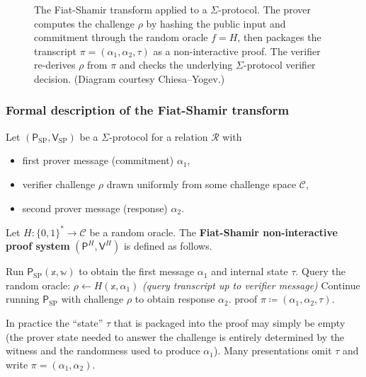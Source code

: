 \documentclass[11pt]{article}
\begin{document}
\begin{figure}[t]
\caption{The Fiat-Shamir transform applied to a $\Sigma$-protocol.
  The prover computes the challenge $\rho$ by hashing the public input
  and commitment through the random oracle $f=H$, then packages the
  transcript $\pi=(\alpha_1,\alpha_2,\tau)$ as a non-interactive proof.
  The verifier re-derives $\rho$ from $\pi$ and checks the underlying
  $\Sigma$-protocol verifier decision.  (Diagram courtesy Chiesa--Yogev.)}
\end{figure}

\subsubsection*{Formal description of the Fiat-Shamir transform}

Let $(\mathsf{P}_{\mathrm{SP}}, \mathsf{V}_{\mathrm{SP}})$ be a
$\Sigma$-protocol for a relation $\mathcal{R}$ with
\begin{itemize}
  \item first prover message (commitment) $\alpha_1$,
  \item verifier challenge $\rho$ drawn uniformly from some challenge
        space $\mathcal{C}$,
  \item second prover message (response) $\alpha_2$.
\end{itemize}
Let $H : \{0,1\}^* \to \mathcal{C}$ be a random oracle.
The \textbf{Fiat-Shamir non-interactive proof system}
$(\mathsf{P}^{H}, \mathsf{V}^{H})$ is defined as follows.

\begin{algorithm}[H]
\caption{Fiat-Shamir Prover $\mathsf{P}^{H}(\mathbb{x},\mathbb{w})$}
\begin{algorithmic}[1]
  \State Run $\mathsf{P}_{\mathrm{SP}}(\mathbb{x},\mathbb{w})$ to
         obtain the first message $\alpha_1$ and internal state $\tau$.
  \State Query the random oracle:
         $\rho \leftarrow H(\mathbb{x}, \alpha_1)$
         \quad \textit{(query transcript up to verifier message)}
  \State Continue running $\mathsf{P}_{\mathrm{SP}}$ with challenge $\rho$
         to obtain response $\alpha_2$.
  \State \Return proof $\pi \coloneqq (\alpha_1, \alpha_2, \tau)$.
\end{algorithmic}
\end{algorithm}

\begin{remark}
  In practice the ``state'' $\tau$ that is packaged into the proof
  may simply be empty (the prover state needed to answer the challenge
  is entirely determined by the witness and the randomness used to
  produce $\alpha_1$).  Many presentations omit $\tau$ and write
  $\pi = (\alpha_1, \alpha_2)$.
\end{remark}
\end{document}
